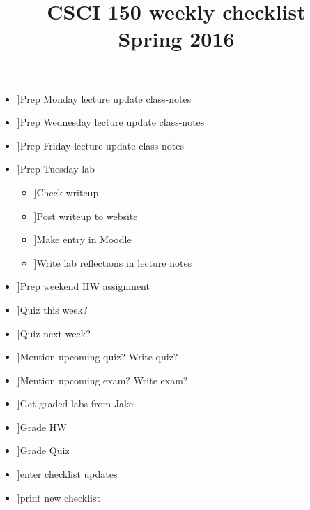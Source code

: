 \documentclass{article}
\title{CSCI 150 weekly checklist \\ {\small Spring 2016}}
\date{}
\newcommand{\cbox}{\framebox[1em]{\phantom{x}}}
\newcommand{\ci}{\item[\cbox]}
\newcommand{\also}{\cbox \hspace{1ex}}
\begin{document}
\maketitle
\thispagestyle{empty}

\begin{itemize}
\ci Prep Monday lecture \also update class-notes
\ci Prep Wednesday lecture \also update class-notes
\ci Prep Friday lecture \also update class-notes \\

\ci Prep Tuesday lab
\begin{itemize}
\ci Check writeup
\ci Post writeup to website
\ci Make entry in Moodle
\ci Write lab reflections in lecture notes
\end{itemize}
\ci Prep weekend HW assignment \\

\ci Quiz this week?
\ci Quiz next week?
\ci Mention upcoming quiz? \also Write quiz?
\ci Mention upcoming exam? \also Write exam? \\

\ci Get graded labs from Jake
\ci Grade HW
\ci Grade Quiz \\

\ci enter checklist updates
\ci print new checklist
\end{itemize}
\end{document}
